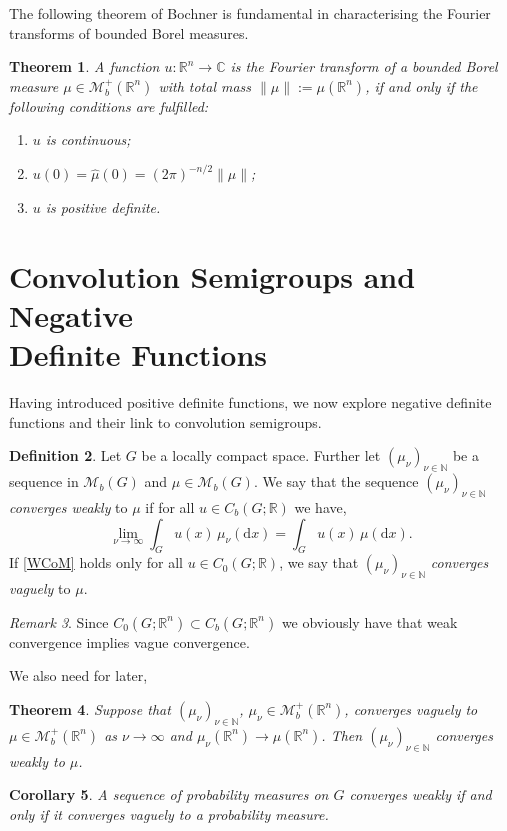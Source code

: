 \documentclass[a4paper, 12pt]{report}
\newtheorem{theorem}{Theorem}[section]
\newtheorem{corollary}[theorem]{Corollary}
\theoremstyle{remark}
\newtheorem{remark}[theorem]{Remark}
\theoremstyle{definition}
\newtheorem{definition}[theorem]{Definition}
\begin{document}
The following theorem of Bochner is fundamental in characterising the Fourier transforms of bounded Borel measures.
\begin{theorem}
A function $u : \mathbb{R}^n \to \mathbb{C}$ is the Fourier transform of a bounded Borel measure $\mu \in \mathcal{M}_b^+(\mathbb{R}^n)$ with total mass $\|\mu\| := \mu(\mathbb{R}^n)$, if and only if the following conditions are fulfilled:
\begin{enumerate}
\item $u$ is continuous;

\item $u(0) = \hat{\mu}(0) = (2\pi)^{-n/2}\|\mu\|$;

\item $u$ is positive definite.
\end{enumerate}
\end{theorem}


\section{Convolution Semigroups and Negative\\Definite Functions}\label{Se.CSaNDF}

Having introduced positive definite functions, we now explore negative definite functions and their link to convolution semigroups.
\begin{definition}
Let $G$ be a locally compact space.  Further let $(\mu_\nu)_{\nu \in \mathbb{N}}$ be a sequence in $\mathcal{M}_b(G)$ and $\mu \in \mathcal{M}_b(G)$.  We say that the sequence $(\mu_\nu)_{\nu \in \mathbb{N}}$ \emph{converges weakly} to $\mu$ if for all $u \in C_b(G; \mathbb{R})$ we have,
\begin{equation}
\lim_{\nu \to \infty}\int_Gu(x)\,\mu_\nu(\mathrm{d}x) = \int_Gu(x)\,\mu(\mathrm{d}x).\label{WCoM}
\end{equation}
If \eqref{WCoM} holds only for all $u \in C_0(G; \mathbb{R})$, we say that $(\mu_\nu)_{\nu \in \mathbb{N}}$ \emph{converges vaguely} to $\mu$.
\end{definition}
\begin{remark}
Since $C_0(G; \mathbb{R}^n) \subset C_b(G; \mathbb{R}^n)$ we obviously have that weak convergence implies vague convergence.
\end{remark}

We also need for later,

\begin{theorem}\label{VCimpliesWC}
Suppose that $(\mu_\nu)_{\nu \in \mathbb{N}}$, $\mu_\nu \in \mathcal{M}_b^+(\mathbb{R}^n)$, converges vaguely to $\mu \in \mathcal{M}_b^+(\mathbb{R}^n)$ as $\nu \to \infty$ and $\mu_\nu(\mathbb{R}^n) \to \mu(\mathbb{R}^n)$.  Then $(\mu_\nu)_{\nu \in \mathbb{N}}$ converges weakly to $\mu$.
\end{theorem}
\begin{corollary}
A sequence of probability measures on $G$ converges weakly if and only if it converges vaguely to a probability measure.
\end{corollary}
\end{document}
